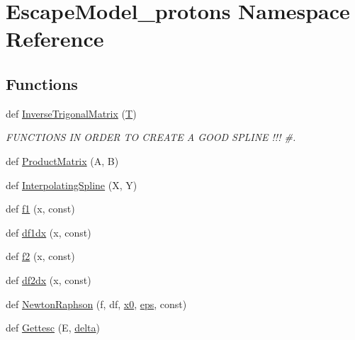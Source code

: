 \hypertarget{namespaceEscapeModel__protons}{}\section{Escape\+Model\+\_\+protons Namespace Reference}
\label{namespaceEscapeModel__protons}
\subsection*{Functions}
\begin{DoxyCompactItemize}
\item 
def \hyperlink{namespaceEscapeModel__protons_a99da3828817a84f723a72c6a8c427556}{Inverse\+Trigonal\+Matrix} (\hyperlink{cr__source_8h_ac94a6e5794c2d7b59588b14025cfba20}{T})
\begin{DoxyCompactList}\small\item\em F\+U\+N\+C\+T\+I\+O\+NS IN O\+R\+D\+ER TO C\+R\+E\+A\+TE A G\+O\+OD S\+P\+L\+I\+NE !!! \#. \end{DoxyCompactList}\item 
def \hyperlink{namespaceEscapeModel__protons_a59100968922dd2b20c49ac6eec1f7233}{Product\+Matrix} (A, B)
\item 
def \hyperlink{namespaceEscapeModel__protons_af3e9b746cbabd75690f82fb933081d77}{Interpolating\+Spline} (X, Y)
\item 
def \hyperlink{namespaceEscapeModel__protons_a367f4fac56e6bb2634ff81b75189ffe1}{f1} (x, const)
\item 
def \hyperlink{namespaceEscapeModel__protons_a05054fa91bda4729dd69a8e2b08965da}{df1dx} (x, const)
\item 
def \hyperlink{namespaceEscapeModel__protons_af1dd1fd70516e62cfdc4758783a6ff22}{f2} (x, const)
\item 
def \hyperlink{namespaceEscapeModel__protons_a0a75b47afc7659e399bcf3d41964eeff}{df2dx} (x, const)
\item 
def \hyperlink{namespaceEscapeModel__protons_a4b3e3727cf055d744268e22e5c328773}{Newton\+Raphson} (f, df, \hyperlink{namespaceEscapeModel__protons_ab902f80b6faa4b93d87cf4b45a390ddb}{x0}, \hyperlink{namespaceEscapeModel__protons_adbda0aec90568e3239247375d7efdb35}{eps}, const)
\item 
def \hyperlink{namespaceEscapeModel__protons_a6849b773bdea7b88ca0149508b16c70a}{Gettesc} (E, \hyperlink{namespaceEscapeModel__protons_a17e769bf37d18480cfd084b18c5d79d5}{delta})
\end{DoxyCompactItemize}
